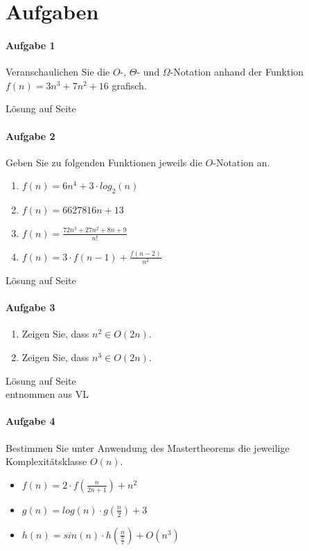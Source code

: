 \documentclass[11pt,a4paper]{scrartcl}
\begin{document}
\section{Aufgaben}
\paragraph{Aufgabe 1} Veranschaulichen Sie die $O$-, $\Theta$- und $\Omega$-Notation anhand der Funktion $f(n) = 3n^{3} + 7n^{2} + 16$ grafisch. 
\begin{flushright}
Lösung auf Seite \pageref{a1:lsg}
\end{flushright}
\paragraph{Aufgabe 2} Geben Sie zu folgenden Funktionen jeweils die $O$-Notation an.
\begin{enumerate}
\item $f(n) = 6n^{4} + 3 \cdot log_{2}(n)$
\item $f(n) = 6627816n + 13$
\item $f(n) = \frac{72n^{3} + 27n^{2} + 8n + 9}{n!}$
\item $f(n) = 3 \cdot f(n-1) + \frac{f(n-2)}{n^{2}}$
\end{enumerate}
\begin{flushright}
Lösung auf Seite \pageref{a2:lsg}
\end{flushright}
\paragraph{Aufgabe 3}
\begin{enumerate}
\item Zeigen Sie, dass $n^{2} \in O(2n)$.
\item Zeigen Sie, dass $n^{3} \in O(2n)$.
\end{enumerate}
\begin{flushright}
Lösung auf Seite \pageref{a3:lsg} \\
entnommen aus VL
\end{flushright}
\paragraph{Aufgabe 4}
Bestimmen Sie unter Anwendung des Mastertheorems die jeweilige Komplexitätsklasse $O(n)$.
\begin{itemize}
\item $f(n) = 2 \cdot f(\frac{n}{2n+1}) + n^{2}$
\item $g(n) = log(n) \cdot g(\frac{n}{2}) + 3$
\item $h(n) = sin(n) \cdot h(\frac{n}{\frac{n}{2}}) + O(n^{3})$
\end{itemize}
\end{document}
